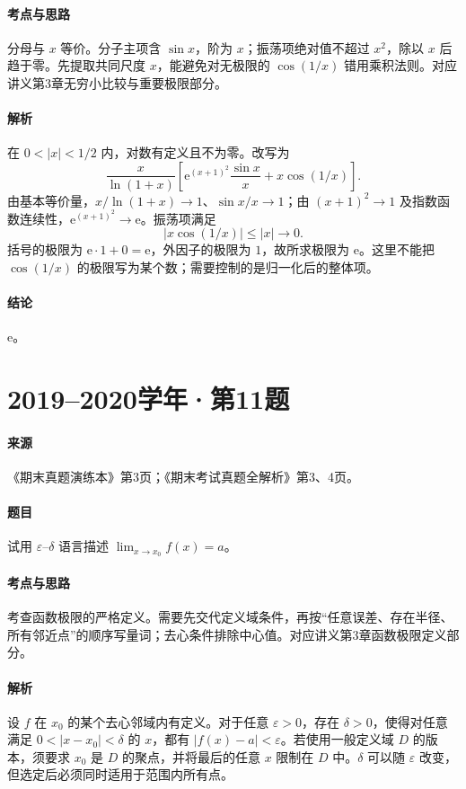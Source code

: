 \documentclass[UTF8,fontset=fandol,12pt,oneside,openany]{ctexrep}
\newcommand{\ee}{\mathrm e}
\theoremstyle{definition}
\begin{document}
\paragraph{考点与思路}分母与 $x$ 等价。分子主项含 $\sin x$，阶为 $x$；振荡项绝对值不超过 $x^2$，除以 $x$ 后趋于零。先提取共同尺度 $x$，能避免对无极限的 $\cos(1/x)$ 错用乘积法则。对应讲义第3章无穷小比较与重要极限部分。
\paragraph{解析}在 $0<|x|<1/2$ 内，对数有定义且不为零。改写为
\[
\frac{x}{\ln(1+x)}
\left[\ee^{(x+1)^2}\frac{\sin x}{x}+x\cos(1/x)\right].
\]
由基本等价量，$x/\ln(1+x)\to1$、$\sin x/x\to1$；由 $(x+1)^2\to1$ 及指数函数连续性，$\ee^{(x+1)^2}\to\ee$。振荡项满足
\[
|x\cos(1/x)|\le|x|\longrightarrow0.
\]
括号的极限为 $\ee\cdot1+0=\ee$，外因子的极限为 $1$，故所求极限为 $\ee$。这里不能把 $\cos(1/x)$ 的极限写为某个数；需要控制的是归一化后的整体项。
\paragraph{结论}$\boxed{\ee}$。

\par\addvspace{18pt}\noindent\begin{minipage}{\linewidth}
\section{2019--2020学年·第11题}
\paragraph{来源}《期末真题演练本》第3页；《期末考试真题全解析》第3、4页。
\paragraph{题目}试用 $\varepsilon$--$\delta$ 语言描述 $\lim_{x\to x_0}f(x)=a$。
\end{minipage}\par
\paragraph{考点与思路}考查函数极限的严格定义。需要先交代定义域条件，再按“任意误差、存在半径、所有邻近点”的顺序写量词；去心条件排除中心值。对应讲义第3章函数极限定义部分。
\paragraph{解析}设 $f$ 在 $x_0$ 的某个去心邻域内有定义。对于任意 $\varepsilon>0$，存在 $\delta>0$，使得对任意满足 $0<|x-x_0|<\delta$ 的 $x$，都有 $|f(x)-a|<\varepsilon$。若使用一般定义域 $D$ 的版本，须要求 $x_0$ 是 $D$ 的聚点，并将最后的任意 $x$ 限制在 $D$ 中。$\delta$ 可以随 $\varepsilon$ 改变，但选定后必须同时适用于范围内所有点。
\end{document}
